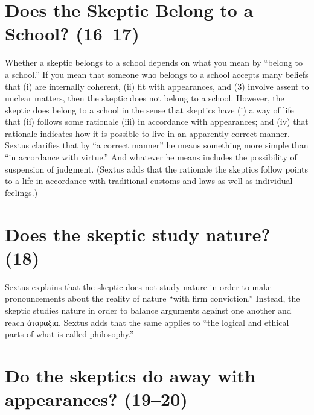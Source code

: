 \section{Does the Skeptic Belong to a School? (16--17)}

Whether a skeptic belongs to a school depends on what you mean by ``belong to a school.'' If you mean that someone who belongs to a school accepts many beliefs that (i) are internally coherent, (ii) fit with appearances, and (3) involve assent to unclear matters, then the skeptic does not belong to a school. However, the skeptic does belong to a school in the sense that skeptics have (i) a way of life that (ii) follows some rationale (iii) in accordance with appearances; and (iv) that rationale indicates how it is possible to live in an apparently correct manner. Sextus clarifies that by ``a correct manner'' he means something more simple than ``in accordance with virtue.'' And whatever he means includes the possibility of suspension of judgment. (Sextus adds that the rationale the skeptics follow points to a life in accordance with traditional customs and laws as well as individual feelings.)

\section{Does the skeptic study nature? (18)}

Sextus explains that the skeptic does not study nature in order to make pronouncements about the reality of nature ``with firm conviction.'' Instead, the skeptic studies nature in order to balance arguments against one another and reach \textgreek{ἀταραξία}. Sextus adds that the same applies to ``the logical and ethical parts of what is called philosophy.''

\section{Do the skeptics do away with appearances? (19--20)}

